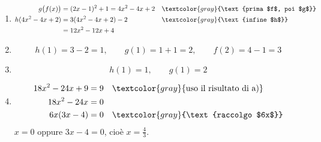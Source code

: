 \begin{question}[ID=1.5, subtitle={Composizione di tre funzioni}, difficulty=difficile, tags={funzioni, composizione}]
\begin{explanation}
\begin{enumerate}
\[\begin{aligned}
    &= 36x^2-60x+26
    \end{aligned}\]
    \item \[\begin{aligned}
    g\big(f(x)\big) &= (2x-1)^2+1=4x^2-4x+2 && \textcolor{gray}{\text{prima $f$, poi $g$}}\\
    h(4x^2-4x+2) &= 3(4x^2-4x+2)-2 && \textcolor{gray}{\text{infine $h$}}\\
    &= 12x^2-12x+4
    \end{aligned}\]
    \item \[ h(1)=3-2=1, \qquad g(1)=1+1=2, \qquad f(2)=4-1=3 \]
    \item \[ h(1)=1, \qquad g(1)=2 \]
    \item \[\begin{aligned}
    18x^2-24x+9 &= 9 && \textcolor{gray}{\text{uso il risultato di a)}}\\
    18x^2-24x &= 0\\
    6x(3x-4) &= 0 && \textcolor{gray}{\text{raccolgo $6x$}}
    \end{aligned}\]
    $x=0$ oppure $3x-4=0$, cioè $x=\tfrac43$.
\end{enumerate}
\end{explanation}
\end{question}

